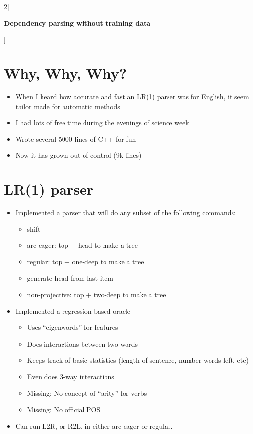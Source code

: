 \documentclass[12pt]{extarticle}
\date{\today}
\begin{document}
\sloppy
\begin{multicols*}{2}[
\centerline{\Huge\bf Dependency parsing without training data}
\vspace{2ex}
]

\section*{Why, Why, Why?}
\begin{itemize}
\item When I heard how accurate and fast an LR(1) parser was for English,
it seem tailor made for automatic methods
\item I had lots of free time during the evenings of science week
\item Wrote several 5000 lines of C++ for fun
\item Now it has grown out of control (9k lines)
\end{itemize}

\section*{LR(1) parser}
\begin{itemize}
\item Implemented a parser that will do any subset of the
following commands:
\begin{itemize}
\item shift
\item arc-eager: top + head to make a tree
\item regular: top + one-deep to make a tree
\item generate head from last item
\item non-projective: top + two-deep to make a tree
\end{itemize}
\item Implemented a regression based oracle
\begin{itemize}
\item Uses ``eigenwords'' for features
\item Does interactions between two words
\item Keeps track of basic statistics (length of sentence, number
words left, etc)
\item Even does 3-way interactions
\item Missing: No concept of ``arity'' for verbs
\item Missing: No official POS
\end{itemize}
\item Can run L2R, or R2L, in either arc-eager or regular.  
\end{itemize}


\end{multicols*}
\end{document}

